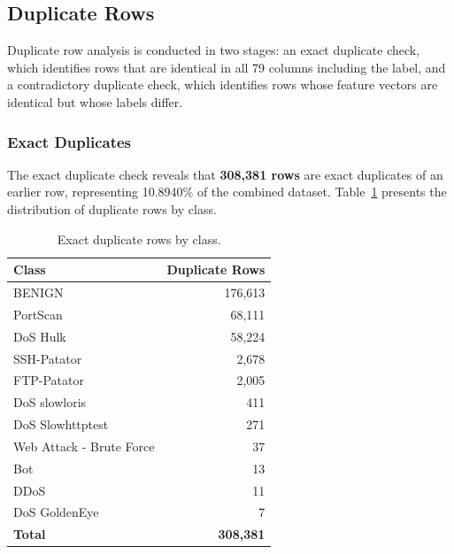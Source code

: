 \documentclass[12pt,a4paper]{article}
\begin{document}
\subsection{Duplicate Rows}

Duplicate row analysis is conducted in two stages: an exact duplicate check, which
identifies rows that are identical in all 79 columns including the label, and a
contradictory duplicate check, which identifies rows whose feature vectors are identical
but whose labels differ.

\subsubsection{Exact Duplicates}

The exact duplicate check reveals that \textbf{308,381 rows} are exact duplicates of
an earlier row, representing 10.8940\% of the combined dataset. Table~\ref{tab:dupes}
presents the distribution of duplicate rows by class.

\begin{table}[H]
    \centering
    \caption{Exact duplicate rows by class.}
    \label{tab:dupes}
    \begin{tabular}{|l|r|}
        \hline
        \textbf{Class}           & \textbf{Duplicate Rows} \\
        \hline
        BENIGN                   & 176,613                 \\
        \hline
        PortScan                 & 68,111                  \\
        \hline
        DoS Hulk                 & 58,224                  \\
        \hline
        SSH-Patator              & 2,678                   \\
        \hline
        FTP-Patator              & 2,005                   \\
        \hline
        DoS slowloris            & 411                     \\
        \hline
        DoS Slowhttptest         & 271                     \\
        \hline
        Web Attack - Brute Force & 37                      \\
        \hline
        Bot                      & 13                      \\
        \hline
        DDoS                     & 11                      \\
        \hline
        DoS GoldenEye            & 7                       \\
        \hline
        \textbf{Total}           & \textbf{308,381}        \\
        \hline
    \end{tabular}
\end{table}
\end{document}
